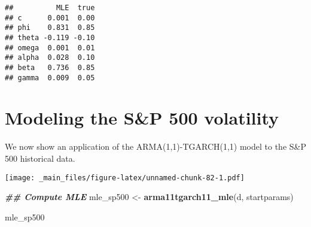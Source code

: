 \documentclass[
]{book}
\newenvironment{Shaded}{\begin{snugshade}}{\end{snugshade}}
\newcommand{\AttributeTok}[1]{\textcolor[rgb]{0.13,0.29,0.53}{#1}}
\newcommand{\DecValTok}[1]{\textcolor[rgb]{0.00,0.00,0.81}{#1}}
\newcommand{\DocumentationTok}[1]{\textcolor[rgb]{0.56,0.35,0.01}{\textbf{\textit{#1}}}}
\newcommand{\FunctionTok}[1]{\textcolor[rgb]{0.13,0.29,0.53}{\textbf{#1}}}
\newcommand{\NormalTok}[1]{#1}
\newcommand{\OtherTok}[1]{\textcolor[rgb]{0.56,0.35,0.01}{#1}}
\newcommand{\SpecialCharTok}[1]{\textcolor[rgb]{0.81,0.36,0.00}{\textbf{#1}}}
\newcommand{\StringTok}[1]{\textcolor[rgb]{0.31,0.60,0.02}{#1}}
\begin{document}
\begin{verbatim}
##          MLE  true
## c      0.001  0.00
## phi    0.831  0.85
## theta -0.119 -0.10
## omega  0.001  0.01
## alpha  0.028  0.10
## beta   0.736  0.85
## gamma  0.009  0.05
\end{verbatim}

\hypertarget{modeling-the-sp-500-volatility}{%
\section{Modeling the S\&P 500 volatility}\label{modeling-the-sp-500-volatility}}

We now show an application of the ARMA(1,1)-TGARCH(1,1) model to the S\&P 500 historical data.

\begin{Shaded}
\end{Shaded}

\texttt{[image: \_main\_files/figure-latex/unnamed-chunk-82-1.pdf]}

\begin{Shaded}
\begin{Highlighting}[]
\DocumentationTok{\#\# Compute MLE}
\NormalTok{mle\_sp500 }\OtherTok{\textless{}{-}} \FunctionTok{arma11tgarch11\_mle}\NormalTok{(d, startparams)}
\end{Highlighting}
\end{Shaded}

\begin{Shaded}
\begin{Highlighting}[]
\NormalTok{mle\_sp500}
\end{Highlighting}
\end{Shaded}
\end{document}
